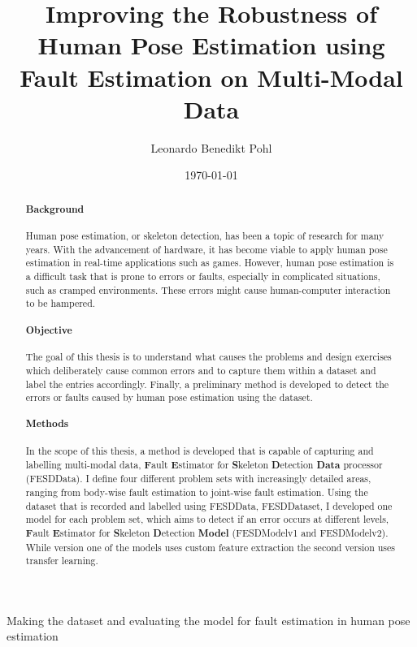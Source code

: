 
\title{Improving the Robustness of Human Pose Estimation using Fault Estimation on Multi-Modal Data}
\author{Leonardo Benedikt Pohl}
Making the dataset and evaluating the model for fault estimation in human pose estimation

\date{\today}


% 


\clearpage

\begin{abstract}  
  \paragraph{Background}
  Human pose estimation, or skeleton detection, has been a topic of research for many years. With the advancement of hardware, it has become viable to apply human pose estimation in real-time applications such as games. However, human pose estimation is a difficult task that is prone to errors or faults, especially in complicated situations, such as cramped environments. These errors might cause human-computer interaction to be hampered.

  \paragraph{Objective}
  The goal of this thesis is to understand what causes the problems and design exercises which deliberately cause common errors and to capture them within a dataset and label the entries accordingly. Finally, a preliminary method is developed to detect the errors or faults caused by human pose estimation using the dataset.

  \paragraph{Methods}
  In the scope of this thesis, a method is developed that is capable of capturing and labelling multi-modal data, \textbf{F}ault \textbf{E}stimator for \textbf{S}keleton \textbf{D}etection \textbf{Data} processor (FESDData). I define four different problem sets with increasingly detailed areas, ranging from body-wise fault estimation to joint-wise fault estimation. Using the dataset that is recorded and labelled using FESDData, FESDDataset, I developed one model for each problem set, which aims to detect if an error occurs at different levels, \textbf{F}ault \textbf{E}stimator for \textbf{S}keleton \textbf{D}etection \textbf{Model} (FESDModelv1 and FESDModelv2). While version one of the models uses custom feature extraction the second version uses transfer learning.


\end{abstract}
